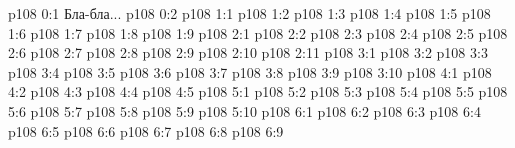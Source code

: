 \author{Одиночный Посланник}
\vs p108 0:1  Бла-бла...
\vs p108 0:2 \pc 
{}
\vs p108 1:1 
\vs p108 1:2 
\vs p108 1:3 
\vs p108 1:4 
\vs p108 1:5 
\vs p108 1:6 
\vs p108 1:7 \pc 
\vs p108 1:8 
\vs p108 1:9 
\vs p108 2:1 
\vs p108 2:2 \pc 
\vs p108 2:3 
\vs p108 2:4 
\vs p108 2:5 
\vs p108 2:6 
\vs p108 2:7 
\vs p108 2:8 
\vs p108 2:9 
\vs p108 2:10 
\vs p108 2:11 
\vs p108 3:1 
\vs p108 3:2 
\vs p108 3:3 
\vs p108 3:4 
\vs p108 3:5 \pc 
\vs p108 3:6 
\vs p108 3:7 \pc 
\vs p108 3:8 
\vs p108 3:9 
\vs p108 3:10 
\vs p108 4:1 
\vs p108 4:2 
\vs p108 4:3 
\vs p108 4:4 
\vs p108 4:5 \pc 
{}
\vs p108 5:1 
\vs p108 5:2 
\vs p108 5:3 
\vs p108 5:4 \pc 
\vs p108 5:5 
\vs p108 5:6 
\vs p108 5:7 
\vs p108 5:8 
\vs p108 5:9 
\vs p108 5:10 
\vs p108 6:1 
\vs p108 6:2 
\vs p108 6:3 \pc 
\vs p108 6:4 
\vs p108 6:5 
\vs p108 6:6 \pc 
\vs p108 6:7 
\vs p108 6:8 \pc 
\vsetoff
\vs p108 6:9 
\quizlink
